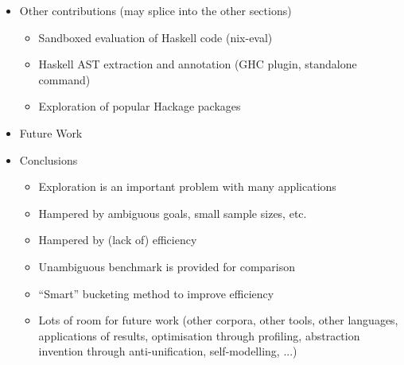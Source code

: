 \documentclass{article}
\begin{document}
\begin{itemize}
\item Other contributions (may splice into the other sections)
  \begin{itemize}
    \item Sandboxed evaluation of Haskell code (nix-eval)
    \item Haskell AST extraction and annotation (GHC plugin, standalone command)
    \item Exploration of popular Hackage packages
  \end{itemize}

\item Future Work

\item Conclusions
  \begin{itemize}
  \item Exploration is an important problem with many applications
  \item Hampered by ambiguous goals, small sample sizes, etc.
  \item Hampered by (lack of) efficiency
  \item Unambiguous benchmark is provided for comparison
  \item ``Smart'' bucketing method to improve efficiency
  \item Lots of room for future work (other corpora, other tools, other
    languages, applications of results, optimisation through profiling,
    abstraction invention through anti-unification, self-modelling, ...)
  \end{itemize}
\end{itemize}
\end{document}
